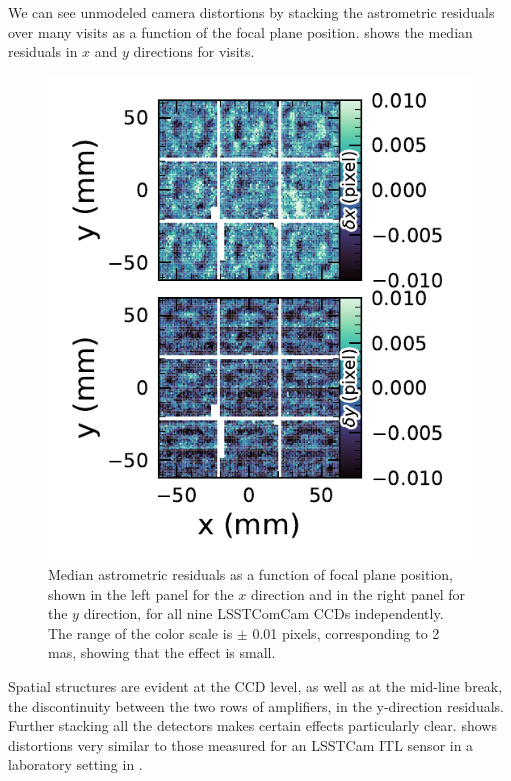 We can see unmodeled camera distortions by stacking the astrometric residuals over many visits as a function of the focal plane position.
 shows the median residuals in $x$ and $y$ directions for \nvisits visits.
\begin{figure}[htb!]
\includegraphics[width=\linewidth]{Astrometry_FoV}
\caption{Median astrometric residuals  as a function of focal plane position, shown in the left panel for the $x$ direction and in the right panel for the $y$ direction, for all nine LSSTComCam CCDs independently.
The range of the color scale is $\pm$ 0.01 pixels, corresponding to 2 mas, showing that the effect is small. }
\label{fig:Astrometry_FoV}
\end{figure}
Spatial structures are evident at the \gls{CCD} level, as well as at the mid-line break,  the discontinuity between the two rows of amplifiers,  in the y-direction residuals.
Further stacking all the detectors makes certain effects particularly clear.
 shows distortions very similar to those measured for an \gls{LSSTCam} \gls{ITL} sensor in a laboratory setting in \citet{2023PASP..135k5003E}.
